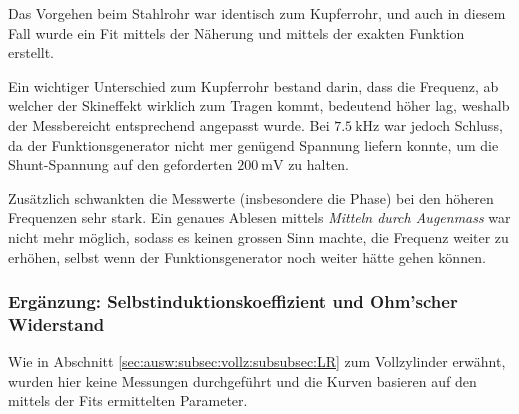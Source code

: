 Das Vorgehen beim  Stahlrohr war identisch zum Kupferrohr, und  auch in diesem
Fall wurde  ein Fit mittels  der N\"aherung  und mittels der  exakten Funktion
erstellt.

Ein   wichtiger   Unterschied  zum   Kupferrohr   bestand   darin,  dass   die
Frequenz,  ab welcher  der  Skineffekt wirklich  zum  Tragen kommt,  bedeutend
h\"oher  lag,  weshalb  der  Messbereicht  entsprechend  angepasst  wurde. Bei
$\SI{7.5}{\kilo\hertz}$ war  jedoch Schluss,  da der  Funktionsgenerator nicht
mer  gen\"ugend  Spannung  liefern  konnte,  um  die  Shunt-Spannung  auf  den
geforderten $\SI{200}{\milli\volt}$ zu halten.

Zus\"atzlich  schwankten  die  Messwerte  (insbesondere  die  Phase)  bei  den
h\"oheren  Frequenzen sehr  stark. Ein genaues  Ablesen mittels  \emph{Mitteln
durch  Augenmass} war  nicht mehr  m\"oglich,  sodass es  keinen grossen  Sinn
machte, die Frequenz  weiter zu erh\"ohen, selbst  wenn der Funktionsgenerator
noch weiter h\"atte gehen k\"onnen.


\begin{figure}[h!]
    \resizebox{\textwidth}{!}{}
\end{figure}



\begin{figure}[h!]
    \resizebox{\textwidth}{!}{}
\end{figure}



\begin{figure}[h!]
    \resizebox{\textwidth}{!}{}
\end{figure}



\clearpage
\subsubsection{Erg\"anzung: Selbstinduktionskoeffizient und Ohm'scher Widerstand}
\label{sec:ausw:subsec:hohlz:st:subsubsec:LR}

Wie  in  Abschnitt \ref{sec:ausw:subsec:vollz:subsubsec:LR}  zum  Vollzylinder
erw\"ahnt, wurden hier keine Messungen  durchgef\"uhrt und die Kurven basieren
auf den mittels der Fits ermittelten Parameter.

